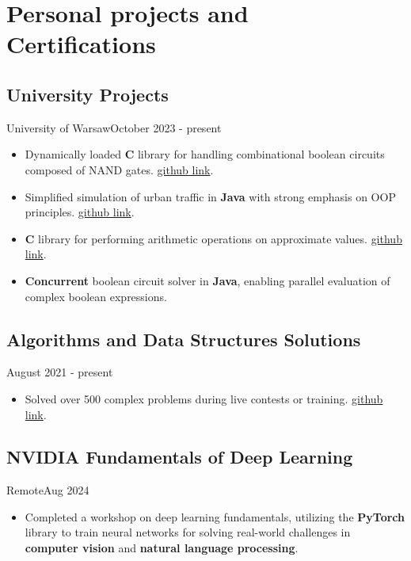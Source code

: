 \section{Personal projects and Certifications}
\subsection{University Projects}{University of Warsaw}{October 2023 - present}
\begin{itemize}
	\item Dynamically loaded \textbf{C} library for handling combinational boolean circuits composed of NAND gates. \href{https://github.com/mrolbiecki/university-projects/tree/main/computer-architecture-and-operating-systems/nand-gates-simulator}{github link}.
	\item Simplified simulation of urban traffic in \textbf{Java} with strong emphasis on OOP principles. \href{https://github.com/mrolbiecki/university-projects/tree/main/object-oriented-programming/public-transport-simulation}{github link}.
	\item \textbf{C} library for performing arithmetic operations on approximate values. \href{https://github.com/mrolbiecki/university-projects/tree/main/introductory-programming/arithmetic-of-approximate-values}{github link}.
	\item \textbf{Concurrent} boolean circuit solver in \textbf{Java}, enabling parallel evaluation of complex boolean expressions.
\end{itemize}

\subsection{Algorithms and Data Structures Solutions}{}{August 2021 - present}
\begin{itemize}
	\item Solved over 500 complex problems during live contests or training. \href{https://github.com/mrolbiecki/competitive-programming-solutions}{github link}.
\end{itemize}

\subsection{NVIDIA Fundamentals of Deep Learning}{Remote}{Aug 2024}
\begin{itemize}
    \item Completed a workshop on deep learning fundamentals, utilizing the \textbf{PyTorch} library to train neural networks for solving real-world challenges in \textbf{computer vision} and \textbf{natural language processing}.
\end{itemize}

\vspace{1em}

